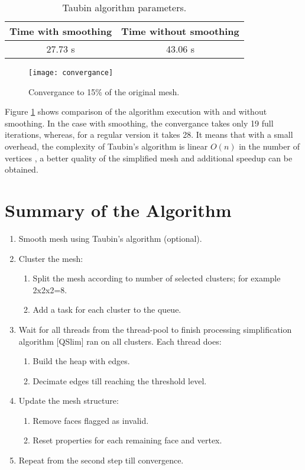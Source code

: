 \begin{table}[h!]
\centering
\begin{tabular}{ |c|c| } 
 \hline
 Time with smoothing & Time without smoothing\\
 \hline
 27.73 s & 43.06 s\\ 
 \hline
\end{tabular}
\caption{Taubin algorithm parameters.}
\label{fig:time_speedup}
\end{table}

\begin{figure}[h!]
  \begin{center}
    \texttt{[image: convergance]}
    \caption{Convergance to 15\% of the original mesh.}
    \label{fig:convergance}
  \end{center}
\end{figure}

Figure \ref{fig:convergance} shows comparison of the algorithm execution with and without smoothing. In the case with smoothing, the convergance takes only 19 full iterations, whereas, for a regular version it takes 28. It means that with a small overhead, the complexity of Taubin's algorithm is linear $O(n)$ in the number of vertices \cite{taubin95}, a better quality of the simplified mesh and additional speedup can be obtained.

\newpage
\section{Summary of the Algorithm}

\begin{enumerate}
\item Smooth mesh using Taubin's algorithm (optional).
\item Cluster the mesh:
\begin{enumerate}
\item Split the mesh according to number of selected clusters; for example 2x2x2=8.
\item Add a task for each cluster to the queue.
\end{enumerate}
\item Wait for all threads from the thread-pool to finish processing simplification algorithm [QSlim] ran on all clusters. Each thread does:
\begin{enumerate}
\item Build the heap with edges.
\item Decimate edges till reaching the threshold level.
\end{enumerate}
\item Update the mesh structure:
\begin{enumerate}
\item Remove faces flagged as invalid.
\item Reset properties for each remaining face and vertex.
\end{enumerate}
\item Repeat from the second step till convergence.
\end{enumerate}


